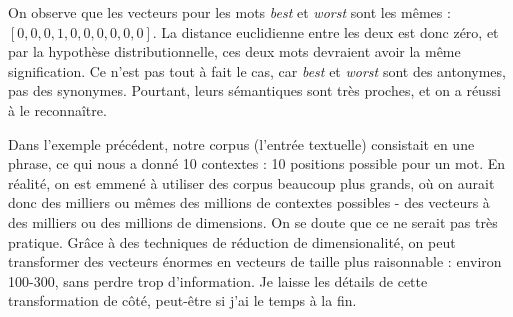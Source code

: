 \documentclass[11pt, a4paper]{report}
\begin{document}
\begin{table}[h]
    \caption{Exemple de contexte} 
    \label{tab:example} 
\end{table}

On observe que les vecteurs pour les mots \textit{best} et \textit{worst} sont les mêmes :
$[0,0,0,1,0,0,0,0,0,0]$. La distance euclidienne entre les deux est donc zéro, et par la 
hypothèse distributionnelle, ces deux mots devraient avoir la même signification. Ce n'est pas 
tout à fait le cas, car \textit{best} et \textit{worst} sont des antonymes, pas des synonymes. 
Pourtant, leurs sémantiques sont très proches, et on a réussi à le reconnaître. 

Dans l'exemple précédent, notre corpus (l'entrée textuelle) consistait en une phrase, ce qui 
nous a donné 10 contextes : 10 positions possible pour un mot.  
En réalité, on est emmené à utiliser des corpus beaucoup plus grands, où on aurait donc des 
milliers ou mêmes des millions de contextes possibles - des vecteurs à des milliers ou des 
millions de dimensions. On se doute que ce ne serait pas très 
pratique. Grâce à des techniques de réduction de dimensionalité, on peut transformer des vecteurs 
énormes en vecteurs de taille plus raisonnable : environ 100-300, sans perdre trop 
d'information. Je laisse les détails de cette 
transformation de côté, peut-être si j'ai le temps à la fin.  
\end{document}
